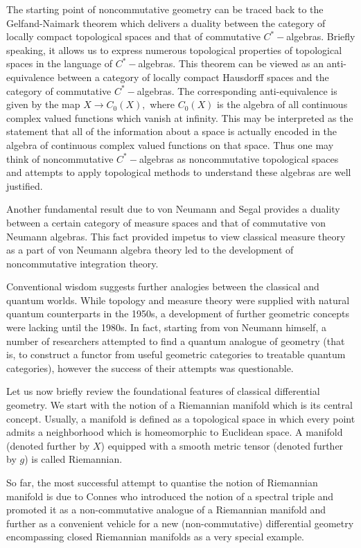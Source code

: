 \documentclass[12pt]{article}
\begin{document}
The starting point of noncommutative geometry can be traced back to the Gelfand-Naimark theorem which delivers a duality between the category of locally compact topological spaces and that of commutative $C^{\ast}-$algebras. Briefly speaking, it allows us to express numerous topological properties of topological spaces in the language of $C^{\ast}-$algebras. This theorem can be viewed as an anti-equivalence between a category of locally compact Hausdorff spaces and the category of commutative $C^{\ast}-$algebras. The corresponding anti-equivalence is given by the map $X\to C_0(X),$ where $C_0(X)$ is the algebra of all continuous complex valued functions which vanish at infinity. This may be interpreted as the statement that all of the information about a space is actually encoded in the algebra of continuous complex valued functions on that space. Thus one may think of noncommutative $C^{\ast}-$algebras as noncommutative topological spaces and attempts to apply topological methods to understand these algebras are well justified. 

Another fundamental result due to von Neumann and Segal provides a duality between a certain category of measure spaces and that of commutative von Neumann algebras. This fact provided impetus to view classical measure theory as a part of von Neumann algebra theory led to the development of noncommutative integration theory.

Conventional wisdom suggests further analogies between the classical and quantum worlds. While topology and measure theory were supplied with natural quantum counterparts in the 1950s, a development of further geometric concepts were lacking until the 1980s. In fact, starting from von Neumann himself, a number of researchers attempted to find a quantum analogue of geometry (that is, to construct a functor from useful geometric categories to treatable quantum categories), however the success of their attempts was questionable.

Let us now briefly review the foundational features of classical differential geometry. We start with the notion of a Riemannian manifold which is its central concept. Usually, a manifold is defined as a topological space in which every point admits a neighborhood which is homeomorphic to Euclidean space. A manifold (denoted further by $X$) equipped with a smooth metric tensor (denoted further by $g$) is called Riemannian.

So far, the most successful attempt to quantise the notion of Riemannian manifold is due to Connes who introduced the notion of a spectral triple and promoted it as a non-commutative analogue of a Riemannian manifold and further as a convenient vehicle for a new (non-commutative) differential geometry encompassing closed Riemannian manifolds as a very special example.  
\end{document}
